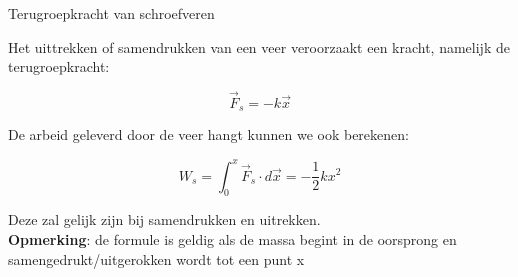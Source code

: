 \begin{app}{Terugroepkracht van schroefveren}
    
    \begin{minipage}{.68\textwidth}
    
    Het uittrekken of samendrukken van een veer veroorzaakt een kracht, namelijk de terugroepkracht: 
    
    \begin{equation*}
        \Vec{F}_s = -k\Vec{x}
    \end{equation*}
    
    De arbeid geleverd door de veer hangt kunnen we ook berekenen:
    
    \begin{equation*}
        W_s = \int_0^x \Vec{F}_s \cdot d\Vec{x} = -\dfrac{1}{2}kx^2
    \end{equation*}

    Deze zal gelijk zijn bij samendrukken en uitrekken. \\

    \textbf{Opmerking}: de formule is geldig als de massa begint in de oorsprong en samengedrukt/uitgerokken wordt tot een punt x
    
    
    
    \end{minipage} 
    \begin{minipage}{.32\textwidth}
    

\end{minipage}
\end{app}
